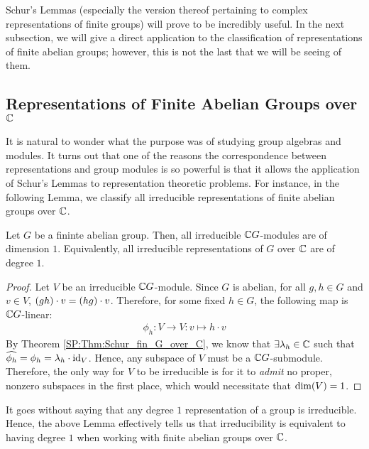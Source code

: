 Schur's Lemmas (especially the version thereof pertaining to complex representations of finite groups) will prove to be incredibly useful. In the next subsection, we will give a direct application to the classification of representations of finite abelian groups; however, this is not the last that we will be seeing of them.

\subsection{Representations of Finite Abelian Groups over $\mathbb{C}$}

It is natural to wonder what the purpose was of studying group algebras and modules. It turns out that one of the reasons the correspondence between representations and group modules is so powerful is that it allows the application of Schur's Lemmas to representation theoretic problems. For instance, in the following Lemma, we classify all irreducible representations of finite abelian groups over $\mathbb{C}$.

\begin{lemma} \label{Ch1:Lem:Fin_Ab_over_C}
    Let $G$ be a fininte abelian group. Then, all irreducible $\mathbb{C} G$-modules are of dimension $1$. Equivalently, all irreducible representations of $G$ over $\mathbb{C}$ are of degree $1$.
\end{lemma}
\begin{proof}
    Let $V$ be an irreducible $\mathbb{C} G$-module. Since $G$ is abelian, for all $g,h \in G$ and $v \in V$, $\left( gh \right) \cdot v = \left( hg \right) \cdot v$. Therefore, for some fixed $h \in G$, the following map is $\mathbb{C} G$-linear:
    \begin{align*}
        \phi_h : V \to V : v \mapsto h \cdot v
    \end{align*}
    By Theorem \ref{SP:Thm:Schur_fin_G_over_C}, we know that $\exists \lambda_h \in \mathbb{C}$ such that $\widehat{\phi_h} = \phi_h = \lambda_h \cdot \operatorname{id}_V$. Hence, any subspace of $V$ must be a $\mathbb{C} G$-submodule. Therefore, the only way for $V$ to be irreducible is for it to \textit{admit} no proper, nonzero subspaces in the first place, which would necessitate that $\dim\!\left( V \right) = 1$.
\end{proof}
\begin{remark}
    It goes without saying that any degree $1$ representation of a group is irreducible. Hence, the above Lemma effectively tells us that irreducibility is equivalent to having degree $1$ when working with finite abelian groups over $\mathbb{C}$.
\end{remark}

